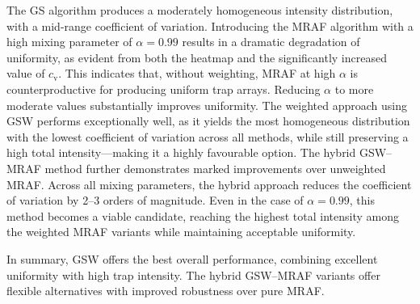 \documentclass[../Thesis-IJspeert.tex]{subfiles}
\begin{document}
The GS algorithm produces a moderately homogeneous intensity distribution, with a mid-range coefficient of variation. Introducing the MRAF algorithm with a high mixing parameter of $\alpha = 0.99$ results in a dramatic degradation of uniformity, as evident from both the heatmap and the significantly increased value of $c_\mathrm{v}$. This indicates that, without weighting, MRAF at high $\alpha$ is counterproductive for producing uniform trap arrays. Reducing $\alpha$ to more moderate values substantially improves uniformity. The weighted approach using GSW performs exceptionally well, as it yields the most homogeneous distribution with the lowest coefficient of variation across all methods, while still preserving a high total intensity---making it a highly favourable option. The hybrid GSW--MRAF method further demonstrates marked improvements over unweighted MRAF. Across all mixing parameters, the hybrid approach reduces the coefficient of variation by \num{2}--\num{3} orders of magnitude. Even in the case of $\alpha = 0.99$, this method becomes a viable candidate, reaching the highest total intensity among the weighted MRAF variants while maintaining acceptable uniformity.

In summary, GSW offers the best overall performance, combining excellent uniformity with high trap intensity. The hybrid GSW--MRAF variants offer flexible alternatives with improved robustness over pure MRAF.
\end{document}
